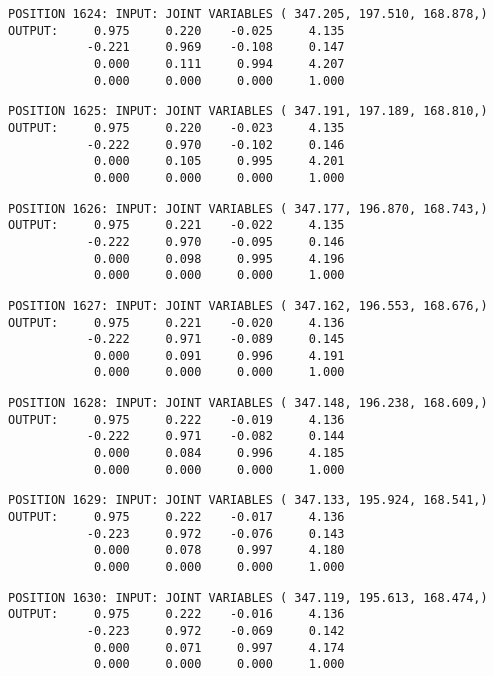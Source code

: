 \begin{verbatim}
POSITION 1624: INPUT: JOINT VARIABLES ( 347.205, 197.510, 168.878,)
OUTPUT:     0.975     0.220    -0.025     4.135
           -0.221     0.969    -0.108     0.147
            0.000     0.111     0.994     4.207
            0.000     0.000     0.000     1.000
\end{verbatim} \pagebreak[1]\begin{verbatim}
POSITION 1625: INPUT: JOINT VARIABLES ( 347.191, 197.189, 168.810,)
OUTPUT:     0.975     0.220    -0.023     4.135
           -0.222     0.970    -0.102     0.146
            0.000     0.105     0.995     4.201
            0.000     0.000     0.000     1.000
\end{verbatim} \pagebreak[1]\begin{verbatim}
POSITION 1626: INPUT: JOINT VARIABLES ( 347.177, 196.870, 168.743,)
OUTPUT:     0.975     0.221    -0.022     4.135
           -0.222     0.970    -0.095     0.146
            0.000     0.098     0.995     4.196
            0.000     0.000     0.000     1.000
\end{verbatim} \pagebreak[1]\begin{verbatim}
POSITION 1627: INPUT: JOINT VARIABLES ( 347.162, 196.553, 168.676,)
OUTPUT:     0.975     0.221    -0.020     4.136
           -0.222     0.971    -0.089     0.145
            0.000     0.091     0.996     4.191
            0.000     0.000     0.000     1.000
\end{verbatim} \pagebreak[1]\begin{verbatim}
POSITION 1628: INPUT: JOINT VARIABLES ( 347.148, 196.238, 168.609,)
OUTPUT:     0.975     0.222    -0.019     4.136
           -0.222     0.971    -0.082     0.144
            0.000     0.084     0.996     4.185
            0.000     0.000     0.000     1.000
\end{verbatim} \pagebreak[1]\begin{verbatim}
POSITION 1629: INPUT: JOINT VARIABLES ( 347.133, 195.924, 168.541,)
OUTPUT:     0.975     0.222    -0.017     4.136
           -0.223     0.972    -0.076     0.143
            0.000     0.078     0.997     4.180
            0.000     0.000     0.000     1.000
\end{verbatim} \pagebreak[1]\begin{verbatim}
POSITION 1630: INPUT: JOINT VARIABLES ( 347.119, 195.613, 168.474,)
OUTPUT:     0.975     0.222    -0.016     4.136
           -0.223     0.972    -0.069     0.142
            0.000     0.071     0.997     4.174
            0.000     0.000     0.000     1.000
\end{verbatim} \pagebreak[1]\begin{verbatim}

\end{verbatim}
